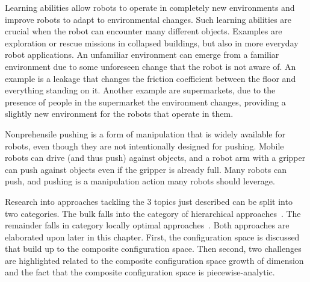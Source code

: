 Learning abilities allow robots to operate in completely new environments and improve robots to adapt to environmental changes. Such learning abilities are crucial when the robot can encounter many different objects. Examples are exploration or rescue missions in collapsed buildings, but also in more everyday robot applications. An unfamiliar environment can emerge from a familiar environment due to some unforeseen change that the robot is not aware of. An example is a leakage that changes the friction coefficient between the floor and everything standing on it. Another example are supermarkets, due to the presence of people in the supermarket the environment changes, providing a slightly new environment for the robots that operate in them.\bs


Nonprehensile pushing is a form of manipulation that is widely available for robots, even though they are not intentionally designed for pushing. Mobile robots can drive (and thus push) against objects, and a robot arm with a gripper can push against objects even if the gripper is already full. Many robots can push, and pushing is a manipulation action many robots should leverage.\bs

Research into approaches tackling the 3 topics just described can be split into two categories. The bulk falls into the category of hierarchical approaches~\cite{ellis_navigation_2022,krontiris_dealing_2015,scholz_navigation_2016,vega-brown_asymptotically_2020,wang_affordancebased_2020}. The remainder falls in category locally optimal approaches~\cite{novin_dynamic_2018,sabbaghnovin_optimal_2016,sabbaghnovin_model_2021}. Both approaches are elaborated upon later in this chapter. First, the configuration space is discussed that build up to the composite configuration space. Then second, two challenges are highlighted related to the composite configuration space growth of dimension and the fact that the composite configuration space is piecewise-analytic.\bs

